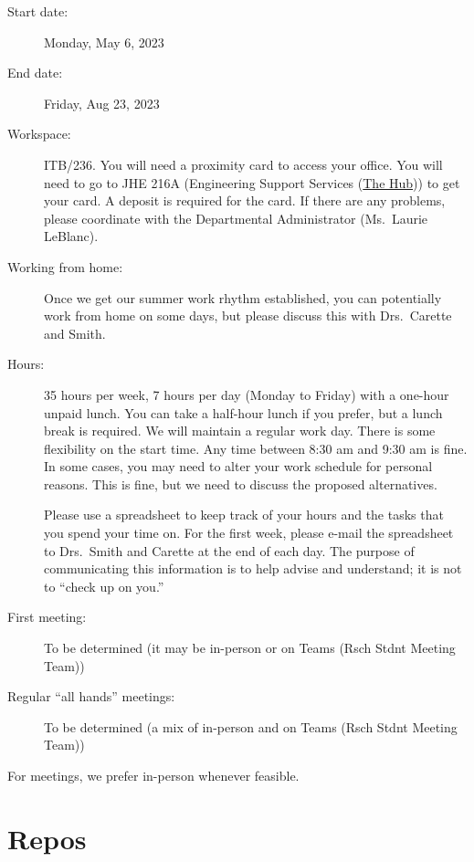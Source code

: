 \documentclass[12pt]{article}
\begin{document}
\begin{description}

\item [Start date:] Monday, May 6, 2023

\item [End date:] Friday, Aug 23, 2023

\item [Workspace:] ITB/236. You will need a proximity card to access your
office.  You will need to go to JHE 216A (Engineering Support Services
(\href{https://www.eng.mcmaster.ca/engineering-support-services-hub/} {The
Hub})) to get your card.  A deposit is required for the card.  If there are any
problems, please coordinate with the Departmental Administrator (Ms.\ Laurie
LeBlanc).  

\item [Working from home:] Once we get our summer work rhythm established, you
can potentially work from home on some days, but please discuss this with Drs.\
Carette and Smith.

\item [Hours:] 35 hours per week, 7 hours per day (Monday to Friday) with a
one-hour unpaid lunch.  You can take a half-hour lunch if you prefer, but a
lunch break is required. We will maintain a regular work day.  There is some
flexibility on the start time.  Any time between 8:30 am and 9:30 am is fine.
In some cases, you may need to alter your work schedule for personal reasons.
This is fine, but we need to discuss the proposed alternatives.

Please use a spreadsheet to keep track of your hours and the tasks that you
spend your time on.  For the first week, please e-mail the spreadsheet to Drs.\
Smith and Carette at the end of each day.  The purpose of communicating this
information is to help advise and understand; it is not to ``check up on you.''

\item [First meeting:] To be determined (it may be in-person or on Teams (Rsch
Stdnt Meeting Team))

\item [Regular ``all hands'' meetings:] To be determined (a mix of in-person and
on Teams (Rsch Stdnt Meeting Team))

\end{description}
For meetings, we prefer in-person whenever feasible.

\section {Repos} \label{SecRepos}
\end{document}
